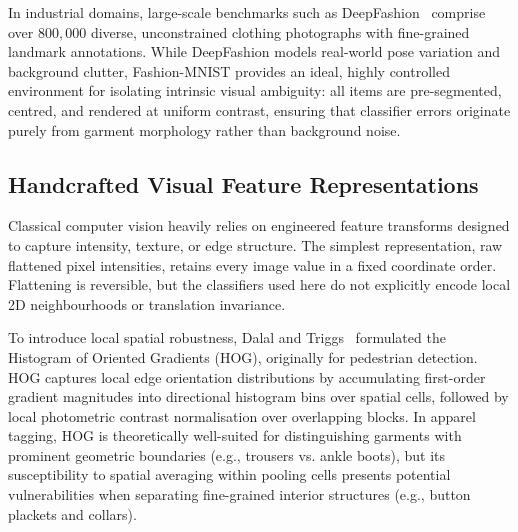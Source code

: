 \documentclass[conference]{IEEEtran}
\begin{document}
In industrial domains, large-scale benchmarks such as
DeepFashion~\cite{liu2016deepfashion} comprise over $800{,}000$ diverse,
unconstrained clothing photographs with fine-grained landmark annotations.
While DeepFashion models real-world pose variation and background clutter,
Fashion-MNIST provides an ideal, highly controlled environment for
isolating intrinsic visual ambiguity: all items are pre-segmented, centred,
and rendered at uniform contrast, ensuring that classifier errors originate
purely from garment morphology rather than background noise.

\subsection{Handcrafted Visual Feature Representations}
Classical computer vision heavily relies on engineered feature transforms
designed to capture intensity, texture, or edge structure. The simplest
representation, raw flattened pixel intensities, retains every image
value in a fixed coordinate order. Flattening is reversible, but the
classifiers used here do not explicitly encode local 2D neighbourhoods
or translation invariance.

To introduce local spatial robustness, Dalal and Triggs~\cite{dalal2005hog}
formulated the Histogram of Oriented Gradients (HOG), originally for
pedestrian detection. HOG captures local edge orientation distributions by
accumulating first-order gradient magnitudes into directional histogram
bins over spatial cells, followed by local photometric contrast normalisation
over overlapping blocks. In apparel tagging, HOG is theoretically
well-suited for distinguishing garments with prominent geometric
boundaries (e.g., trousers vs. ankle boots), but its susceptibility to
spatial averaging within pooling cells presents potential vulnerabilities
when separating fine-grained interior structures (e.g., button plackets and
collars).
\end{document}
